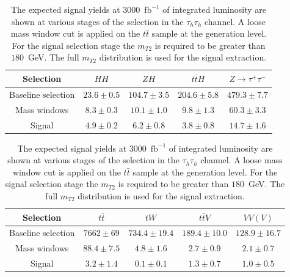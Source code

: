 \begin{table}[!ht]
\begin{center} 
\begin{tabular}{|c|c|c|c|c|}
\hline
Selection  & $HH$ & $ZH$ & $t\bar{t}H$ & $Z\rightarrow \tau^{+}\tau^{-}$  \\  \hline
Baseline selection & $23.6\pm0.5$ & $104.7\pm3.5$ & $204.6\pm5.8$ & $479.3\pm7.7$  \\
Mass windows  & $8.3\pm0.3$ & $10.1\pm1.0$ & $9.8\pm1.3$ & $60.3\pm3.3$ \\ 
Signal  & $4.9\pm0.2$ & $6.2\pm0.8$ &  $3.8\pm0.8$ & $14.7\pm1.6$ \\ \hline
\end{tabular}

\vspace{2mm}

\begin{tabular}{|c|c|c|c|c|}
\hline
Selection   & $t\bar{t}$ & $tW$ & $t\bar{t}V$ & $VV(V)$  \\  \hline
Baseline selection & $7662\pm69$ & $734.4\pm19.4$ & $189.4\pm10.0$ & $128.9\pm16.7$  \\
Mass windows  & $88.4\pm7.5$ & $4.8\pm1.6$ & $2.7\pm0.9$ & $2.1\pm0.7$ \\ 
Signal  & $3.2\pm1.4$ & $0.1\pm0.1$ & $1.3\pm0.7$ & $1.0\pm0.5$ \\ \hline
\end{tabular}

\caption{ The expected signal yields at $3000$~$\mathrm{fb}^{-1}$ of integrated luminosity are shown at various stages of the  selection in the $\tau_{h}\tau_{h}$ channel. A loose mass window cut is applied on the $t\bar{t}$ sample at the  generation level. For the signal selection stage the $m_{T2}$ is required to be greater than $180$~GeV. The full $m_{T2}$ distribution is used for the signal extraction.}
\label{tab:hhsig}
\end{center}
\end{table}


